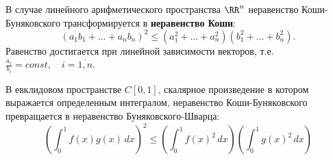\begin{corollary}
    В случае линейного арифметического пространства $\RR^n$ неравенство Коши-Буняковского трансформируется в \textbf{неравенство Коши}:
    $$(a_1b_1 + \ldots + a_nb_n)^2 \leq (a_1^2 + \ldots + a_n^2)(b_1^2 + \ldots + b_n^2).$$
    Равенство достигается при линейной зависимости векторов, т.е. $\frac{a_i}{b_i} = const, \quad i = \overline{1, n}$.
\end{corollary}

\begin{corollary}
    В евклидовом пространстве $C[0, 1]$, скалярное произведение в котором выражается определенным интегралом, неравенство Коши-Буняковского превращается в неравенство Буняковского-Шварца:
    $$\left( \int_0^1 f(x)g(x) \, dx \right)^2 \le \left( \int_0^1 f(x)^2 \, dx \right) \left( \int_0^1 g(x)^2 \, dx \right)$$
\end{corollary}
